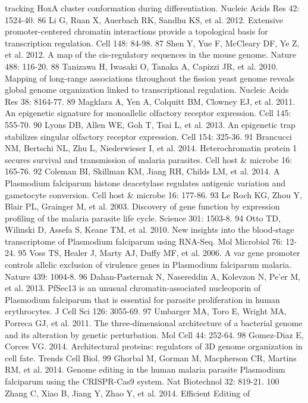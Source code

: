 tracking HoxA cluster conformation during differentiation. Nucleic Acids Res
42: 1524-40.
86  Li G, Ruan X, Auerbach RK, Sandhu KS, et al. 2012. Extensive
promoter-centered chromatin interactions provide a topological basis for
transcription regulation. Cell 148: 84-98.
87  Shen Y, Yue F, McCleary DF, Ye Z, et al. 2012. A map of the cis-regulatory
sequences in the mouse genome. Nature 488: 116-20.
88  Tanizawa H, Iwasaki O, Tanaka A, Capizzi JR, et al. 2010. Mapping of
long-range associations throughout the fission yeast genome reveals global
genome organization linked to transcriptional regulation. Nucleic Acids Res
38: 8164-77.
89  Magklara A, Yen A, Colquitt BM, Clowney EJ, et al. 2011. An epigenetic
signature for monoallelic olfactory receptor expression. Cell 145: 555-70.
90  Lyons DB, Allen WE, Goh T, Tsai L, et al. 2013. An epigenetic trap
stabilizes singular olfactory receptor expression. Cell 154: 325-36.
91  Brancucci NM, Bertschi NL, Zhu L, Niederwieser I, et al. 2014.
Heterochromatin protein 1 secures survival and transmission of malaria
parasites. Cell host \& microbe 16: 165-76.
92  Coleman BI, Skillman KM, Jiang RH, Childs LM, et al. 2014. A Plasmodium
falciparum histone deacetylase regulates antigenic variation and gametocyte
conversion. Cell host \& microbe 16: 177-86.
93  Le Roch KG, Zhou Y, Blair PL, Grainger M, et al. 2003. Discovery of gene
function by expression profiling of the malaria parasite life cycle. Science
301: 1503-8.
94  Otto TD, Wilinski D, Assefa S, Keane TM, et al. 2010. New insights into
the blood-stage transcriptome of Plasmodium falciparum using RNA-Seq. Mol
Microbiol 76: 12-24.
95  Voss TS, Healer J, Marty AJ, Duffy MF, et al. 2006. A var gene promoter
controls allelic exclusion of virulence genes in Plasmodium falciparum
malaria. Nature 439: 1004-8.
96  Dahan-Pasternak N, Nasereddin A, Kolevzon N, Pe'er M, et al. 2013. PfSec13
is an unusual chromatin-associated nucleoporin of Plasmodium falciparum that
is essential for parasite proliferation in human erythrocytes. J Cell Sci 126:
3055-69.
97  Umbarger MA, Toro E, Wright MA, Porreca GJ, et al. 2011. The
three-dimensional architecture of a bacterial genome and its alteration by
genetic perturbation. Mol Cell 44: 252-64.
98  Gomez-Diaz E, Corces VG. 2014. Architectural proteins: regulators of 3D
genome organization in cell fate. Trends Cell Biol.
99  Ghorbal M, Gorman M, Macpherson CR, Martins RM, et al. 2014. Genome
editing in the human malaria parasite Plasmodium falciparum using the
CRISPR-Cas9 system. Nat Biotechnol 32: 819-21.
100 Zhang C, Xiao B, Jiang Y, Zhao Y, et al. 2014. Efficient Editing of

